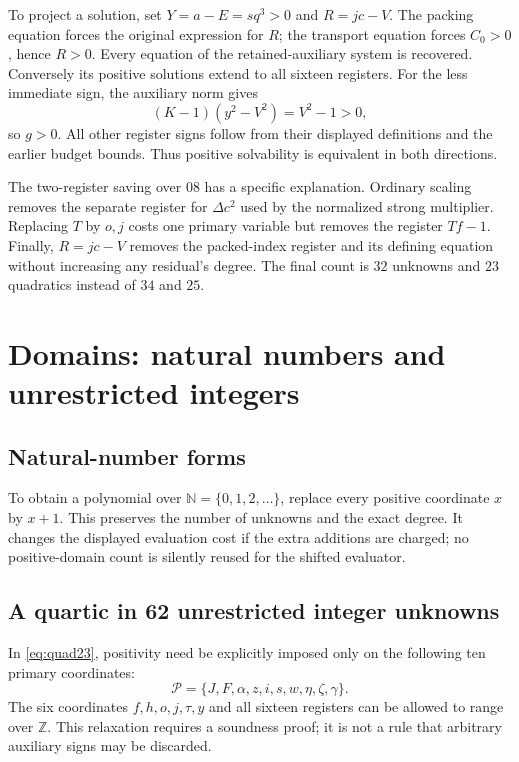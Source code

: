 \documentclass[11pt,a4paper]{article}
\theoremstyle{remark}\newtheorem{remark}[theorem]{Remark}
\newcommand{\N}{\mathbb N}
\newcommand{\Z}{\mathbb Z}
\begin{document}
To project a solution, set $Y=a-E=sq^3>0$ and $R=jc-V$.
The packing equation forces the original expression for $R$; the
transport equation forces $C_0>0$, hence $R>0$.
Every equation of the retained-auxiliary system is recovered.
Conversely its positive solutions extend to all sixteen registers.
For the less immediate sign, the auxiliary norm gives
\[
 (K-1)(y^2-V^2)=V^2-1>0,
\]
so $g>0$. All other register signs follow from their displayed
definitions and the earlier budget bounds. Thus positive solvability
is equivalent in both directions.

The two-register saving over 08 has a specific explanation.
Ordinary scaling removes the separate register for $\Delta c^2$ used
by the normalized strong multiplier. Replacing $T$ by $o,j$ costs
one primary variable but removes the register $Tf-1$. Finally,
$R=jc-V$ removes the packed-index register and its defining equation
without increasing any residual's degree. The final count is $32$
unknowns and $23$ quadratics instead of $34$ and $25$.

\section{Domains: natural numbers and unrestricted integers}
\label{sec:domains}

\subsection{Natural-number forms}
To obtain a polynomial over $\N=\{0,1,2,\ldots\}$, replace every
positive coordinate $x$ by $x+1$. This preserves the number of
unknowns and the exact degree. It changes the displayed evaluation
cost if the extra additions are charged; no positive-domain count
is silently reused for the shifted evaluator.

\subsection{A quartic in 62 unrestricted integer unknowns}
In \eqref{eq:quad23}, positivity need be explicitly imposed only on
the following ten primary coordinates:
\begin{equation}
 \mathcal P=\{J,F,\alpha,z,i,s,w,\eta,\zeta,\gamma\}.
 \label{eq:tenpositive}
\end{equation}
The six coordinates $f,h,o,j,\tau,y$ and all sixteen registers
can be allowed to range over $\Z$. This relaxation requires a
soundness proof; it is not a rule that arbitrary auxiliary signs
may be discarded.
\end{document}
